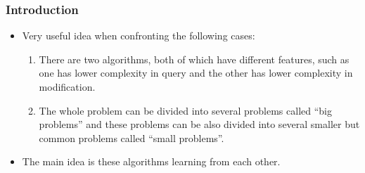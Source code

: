 	\begin{frame}
		\frametitle{Introduction}
		\begin{itemize}
			\item Very useful idea when confronting the following cases:\pause
			\begin{enumerate}
				\item There are two algorithms, both of which have different features, such as one has
				lower complexity in query and the other has lower complexity in modification.\pause
				\item The whole problem can be divided into several problems called ``big problems'' and these problems can be also
				divided into several smaller but common problems called ``small problems''.\pause
			\end{enumerate}
			\item The main idea is these algorithms learning from each other.
		\end{itemize}
	\end{frame}
